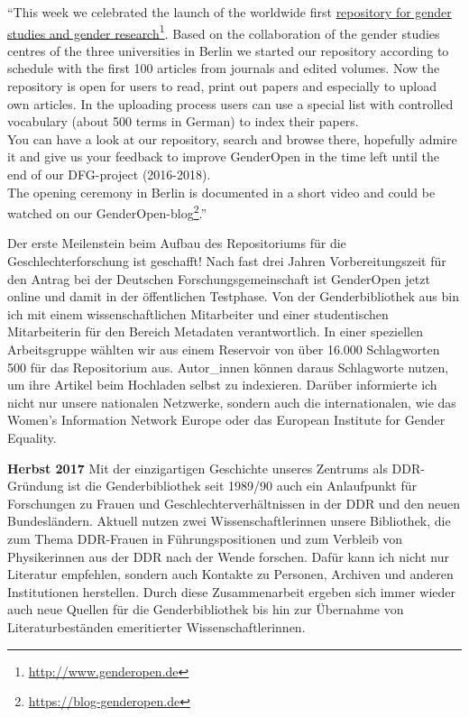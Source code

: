 \documentclass[a4paper,
fontsize=11pt,
oneside,
numbers=noperiodatend,
parskip=half-,
bibliography=totoc,
final
]{scrartcl}
\begin{document}
\enquote{This week we celebrated the launch of the worldwide first
\href{http://www.genderopen.de/}{repository for gender studies and
gender research}\footnote{\url{http://www.genderopen.de}}. Based on the
collaboration of the gender studies centres of the three universities in
Berlin we started our repository according to schedule with the first
100 articles from journals and edited volumes. Now the repository is
open for users to read, print out papers and especially to upload own
articles. In the uploading process users can use a special list with
controlled vocabulary (about 500 terms in German) to index their
papers.\\
You can have a look at our repository, search and browse there,
hopefully admire it and give us your feedback to improve GenderOpen in
the time left until the end of our DFG-project (2016-2018).\\
The opening ceremony in Berlin is documented in a short video and could
be watched on our GenderOpen-blog\footnote{\url{https://blog-genderopen.de}}.}

Der erste Meilenstein beim Aufbau des Repositoriums für die
Geschlechterforschung ist geschafft! Nach fast drei Jahren
Vorbereitungszeit für den Antrag bei der Deutschen
Forschungsgemeinschaft ist GenderOpen jetzt online und damit in der
öffentlichen Testphase. Von der Genderbibliothek aus bin ich mit einem
wissenschaftlichen Mitarbeiter und einer studentischen Mitarbeiterin für
den Bereich Metadaten verantwortlich. In einer speziellen Arbeitsgruppe
wählten wir aus einem Reservoir von über 16.000 Schlagworten 500 für das
Repositorium aus. Autor\_innen können daraus Schlagworte nutzen, um ihre
Artikel beim Hochladen selbst zu indexieren. Darüber informierte ich
nicht nur unsere nationalen Netzwerke, sondern auch die internationalen,
wie das Women's Information Network Europe oder das European Institute
for Gender Equality.

\textbf{Herbst 2017} Mit der einzigartigen Geschichte unseres Zentrums
als DDR-Gründung ist die Genderbibliothek seit 1989/90 auch ein
Anlaufpunkt für Forschungen zu Frauen und Geschlechterverhältnissen in
der DDR und den neuen Bundesländern. Aktuell nutzen zwei
Wissenschaftlerinnen unsere Bibliothek, die zum Thema DDR-Frauen in
Führungspositionen und zum Verbleib von Physikerinnen aus der DDR nach
der Wende forschen. Dafür kann ich nicht nur Literatur empfehlen,
sondern auch Kontakte zu Personen, Archiven und anderen Institutionen
herstellen. Durch diese Zusammenarbeit ergeben sich immer wieder auch
neue Quellen für die Genderbibliothek bis hin zur Übernahme von
Literaturbeständen emeritierter Wissenschaftlerinnen.
\end{document}
